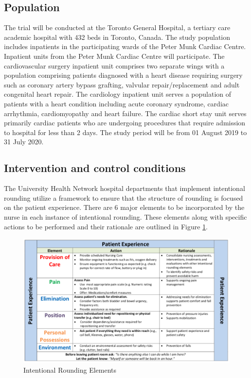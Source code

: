 \documentclass[12pt]{article}
\begin{document}
\subsection{Population}
The trial will be conducted at the Toronto General Hospital, a tertiary care academic hospital with 432 beds in Toronto, Canada. The study population includes inpatients in the participating wards of the Peter Munk Cardiac Centre. Inpatient units from the Peter Munk Cardiac Centre will participate. The cardiovascular surgery inpatient unit comprises two separate wings with a population comprising patients diagnosed with a heart disease requiring surgery such as coronary artery bypass grafting, valvular repair/replacement and adult congenital heart repair. The cardiology inpatient unit serves a population of patients with a heart condition including acute coronary syndrome, cardiac arrhythmia, cardiomyopathy and heart failure. The cardiac short stay unit serves primarily cardiac patients who are undergoing procedures that require admission to hospital for less than 2 days.  The study period will be from 01 August 2019 to 31 July 2020.



\subsection{Intervention and control conditions}
The University Health Network hospital departments that implement intentional rounding utilize a framework to ensure that the structure of rounding is focused on the patient experience. There are 6 major elements to be incorporated by the nurse in each instance of intentional rounding. These elements along with specific actions to be performed and their rationale are outlined in Figure \ref{fig1}. 

\begin{figure}[ht]
\centering
\includegraphics[width=\textwidth]{IRelements.png}
\caption{Intentional Rounding Elements}
\label{fig1}
\end{figure}
\end{document}
